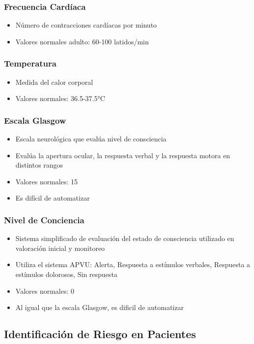 \subsubsection{Frecuencia Cardíaca}
\begin{itemize}
    \item Número de contracciones cardíacas por minuto
    \item Valores normales adulto: 60-100 latidos/min
\end{itemize}

\subsubsection{Temperatura}
\begin{itemize}
    \item Medida del calor corporal
    \item Valores normales: 36.5-37.5°C
\end{itemize}

\subsubsection{Escala Glasgow}
\begin{itemize}
    \item Escala neurológica que evalúa nivel de consciencia
    \item Evalúa la apertura ocular, la respuesta verbal y la respuesta motora en distintos rangos
    \item Valores normales: 15
    \item Es difícil de automatizar
\end{itemize}

\subsubsection{Nivel de Conciencia}
\begin{itemize}
    \item Sistema simplificado de evaluación del estado de consciencia utilizado en valoración inicial y monitoreo
    \item Utiliza el sistema APVU: Alerta, Respuesta a estímulos verbales, Respuesta a estímulos dolorosos, Sin respuesta
    \item Valores normales: 0
    \item Al igual que la escala Glasgow, es dificil de automatizar
\end{itemize}
\newpage
\subsection{Identificación de Riesgo en Pacientes}


